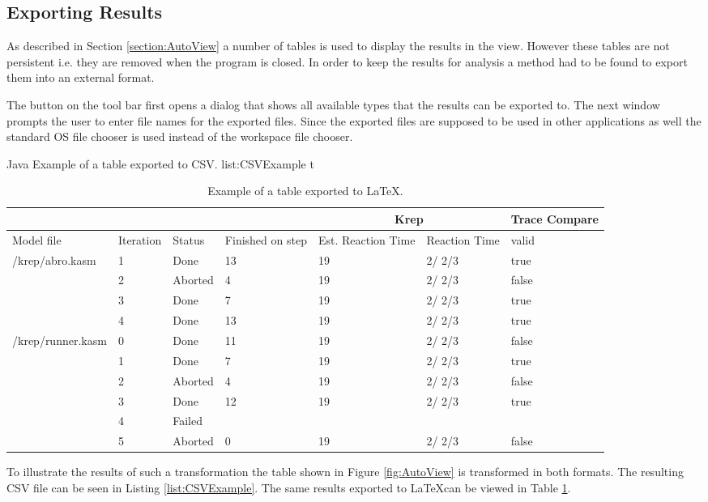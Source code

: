 \subsection{Exporting Results}
\label{section:AutoExportResults}
As described in Section \ref{section:AutoView} a number of tables is used to display the results in the view.
However these tables are not persistent i.e. they are removed when the program is closed.
In order to keep the results for analysis a method had to be found to export them into
an external format.

The button on the tool bar first opens a dialog that shows all available types that the results can
be exported to. The next window prompts the user to enter file names for the exported files.
Since the exported files are supposed to be used in other applications as well the standard 
\ac{OS} file chooser is used instead of the workspace file chooser.

\listingjava
{}
{Java}
{Example of a table exported to CSV.}
{list:CSVExample}
{t}
\begin{table}[b]
\begin{tabular}{| l | p{1.2cm} | p{1.2cm} | p{1.2cm} | p{1cm} | p{1.4cm} | p{0.5cm} | } \hline
\multicolumn{4}{|c|}{}
 & \multicolumn{2}{c|}{Krep}
 & \multicolumn{1}{c|}{Trace Compare}
\\ \hline
Model file & Iteration & Status & Finished on step & Est. Reaction Time & Reaction Time & valid \\ \hline
\multirow{4}{*}{/krep/abro.kasm} & 1 & Done & 13 & 19 & {2/ 2/3} & true \\ 
 & 2 & Aborted & 4 & 19 & {2/ 2/3} & false \\ 
 & 3 & Done & 7 & 19 & {2/ 2/3} & true \\ 
 & 4 & Done & 13 & 19 & {2/ 2/3} & true \\ 
\hline
\multirow{6}{*}{/krep/runner.kasm} & 0 & Done & 11 & 19 & {2/ 2/3} & false \\ 
 & 1 & Done & 7 & 19 & {2/ 2/3} & true \\ 
 & 2 & Aborted & 4 & 19 & {2/ 2/3} & false \\ 
 & 3 & Done & 12 & 19 & {2/ 2/3} & true \\ 
 & 4 & Failed &  &  &  &  \\ 
 & 5 & Aborted & 0 & 19 & {2/ 2/3} & false \\ 
\hline
\end{tabular}
  \caption[Example of a table exported to \LaTeX .]%
  {Example of a table exported to \LaTeX .\protect}
\label{table:LatexExample}
\end{table}
To illustrate the results of such a transformation the table shown in Figure \ref{fig:AutoView} is
transformed in both formats. The resulting \ac{CSV} file can be seen in Listing \ref{list:CSVExample}. The same
results exported to \LaTeX can be viewed in Table \ref{table:LatexExample}.